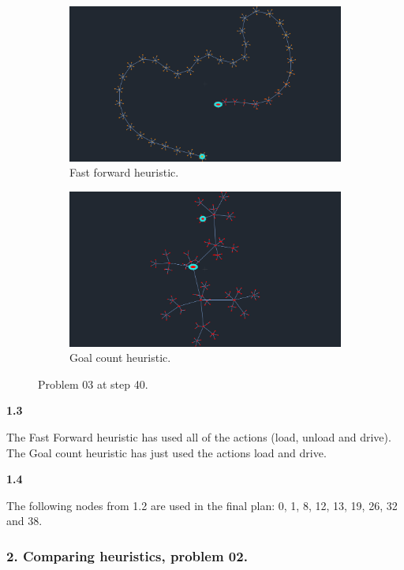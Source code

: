 \documentclass[a4paper,10pt]{article}
\begin{document}
\begin{figure}
    \centering
    \begin{subfigure}{.5\textwidth}
        \centering
        \includegraphics[width=.9\linewidth]{p03-ff-40.png}
        \caption{Fast forward heuristic.}
    \end{subfigure}%
    \begin{subfigure}{.5\textwidth}
        \centering
        \includegraphics[width=.9\linewidth]{p03-gc-40.png}
        \caption{Goal count heuristic.}
    \end{subfigure}
    \caption{Problem 03 at step 40.} 
    \label{fig:p03-40}
\end{figure}

\textbf{1.3}

The Fast Forward heuristic has used all of the actions (load, unload and drive).
The Goal count heuristic has just used the actions load and drive.

\textbf{1.4}

The following nodes from 1.2 are used in the final plan: 0, 1, 8, 12, 13, 19, 26, 32 and 38.

\subsubsection*{2. Comparing heuristics, problem 02.}
\end{document}
